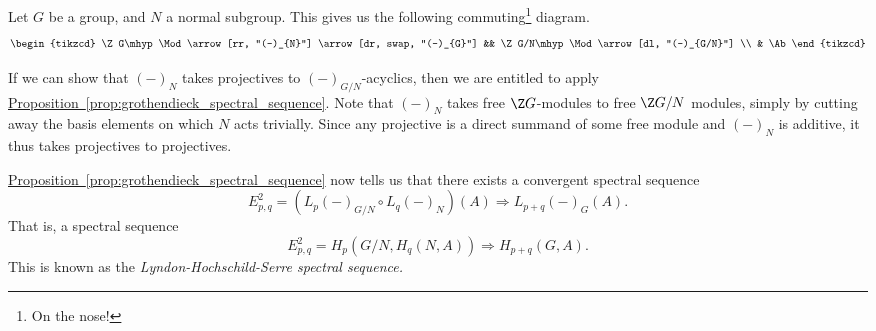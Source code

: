 \documentclass[main.tex]{subfiles}
\begin{document}
\begin{example}
  \label{eg:lyndon_hochschild_serre_spectral_sequence}
  Let $G$ be a group, and $N$ a normal subgroup. This gives us the following commuting\footnote{On the nose!} diagram.
  \begin{equation*}
    \begin{tikzcd}
      \Z G\mhyp\Mod
      \arrow[rr, "(-)_{N}"]
      \arrow[dr, swap, "(-)_{G}"]
      && \Z G/N\mhyp\Mod
      \arrow[dl, "(-)_{G/N}"]
      \\
      & \Ab
    \end{tikzcd}
  \end{equation*}

  If we can show that $(-)_{N}$ takes projectives to $(-)_{G/N}$-acyclics, then we are entitled to apply \hyperref[prop:grothendieck_spectral_sequence]{Proposition~\ref*{prop:grothendieck_spectral_sequence}}. Note that $(-)_{N}$ takes free $\Z G$-modules to free $\Z G/N$ modules, simply by cutting away the basis elements on which $N$ acts trivially. Since any projective is a direct summand of some free module and $(-)_{N}$ is additive, it thus takes projectives to projectives.

  \hyperref[prop:grothendieck_spectral_sequence]{Proposition~\ref*{prop:grothendieck_spectral_sequence}} now tells us that there exists a convergent spectral sequence
  \begin{equation*}
    E^{2}_{p, q} = (L_{p}(-)_{G/N} \circ L_{q}(-)_{N})(A) \Longrightarrow L_{p+q}(-)_{G}(A).
  \end{equation*}
  That is, a spectral sequence
  \begin{equation*}
    E^{2}_{p, q} = H_{p}(G/N, H_{q}(N, A)) \Longrightarrow H_{p+q}(G, A).
  \end{equation*}
  This is known as the \emph{Lyndon-Hochschild-Serre spectral sequence.}
\end{example}
\end{document}
